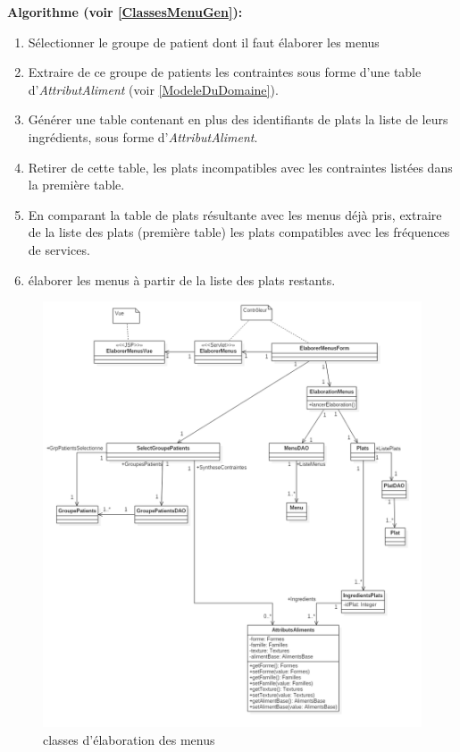 \textbf{Algorithme (voir \autoref{ClassesMenuGen}):}
\begin{enumerate}
\item Sélectionner le groupe de patient dont il faut élaborer les menus
\item Extraire de ce groupe de patients les contraintes sous forme d'une table d'\emph{AttributAliment} (voir \autoref{ModeleDuDomaine}).
\item Générer une table contenant en plus des identifiants de plats la liste de leurs ingrédients, sous forme d'\emph{AttributAliment}.
\item Retirer de cette table, les plats incompatibles avec les contraintes listées dans la première table.
\item En comparant la table de plats résultante avec les menus déjà pris, extraire de la liste des plats (première table) les plats compatibles avec les fréquences de services.
\item élaborer les menus à partir de la liste des plats restants.
\end{enumerate}

\begin{figure}
  \centering
      \includegraphics[width=1.00\textwidth]{../../CasDUtilisations/MenuGen/Classes/EMC.png} %
\caption{classes d'élaboration des menus}
\label{ClassesMenuGen}
\end{figure}

